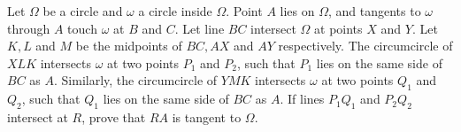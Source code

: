 Let $\Omega$ be a circle and $\omega$ a circle inside $\Omega$.
Point $A$ lies on $\Omega$, and tangents to $\omega$ through $A$ touch $\omega$ at $B$ and $C$.
Let line $BC$ intersect $\Omega$ at points $X$ and $Y$.
Let $K, L$ and $M$ be the midpoints of $BC, AX$ and $AY$ respectively.
The circumcircle of $XLK$ intersects $\omega$ at two points $P_1$ and $P_2$,
such that $P_1$ lies on the same side of $BC$ as $A$.
Similarly, the circumcircle of $YMK$ intersects $\omega$ at two points $Q_1$ and $Q_2$,
such that $Q_1$ lies on the same side of $BC$ as $A$.
If lines $P_1Q_1$ and $P_2Q_2$ intersect at $R$, prove that $RA$ is tangent to $\Omega$.
